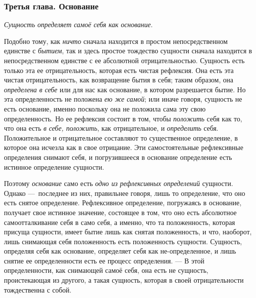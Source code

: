 \subsubsection{Третья глава. Основание}
{\em Сущность определяет самоё себя как основание}.

Подобно тому, как {\em ничто} сначала находится в
простом непосредственном единстве с {\em бытием}, так и
здесь простое тождество сущности сначала находится в непосредственном
единстве с ее абсолютной отрицательностью. Сущность есть только эта ее
отрицательность, которая есть чистая рефлексия. Она есть эта чистая
отрицательность, как возвращение бытия в себя; таким образом, она
{\em определена в себе} или для нас как основание, в
котором разрешается бытие. Но эта определенность не положена
{\em ею же самой}; или иначе говоря, сущность не есть
основание, именно поскольку она не положила сама эту свою определенность.
Но ее рефлексия состоит в том, чтобы {\em положить}
себя как то, что она есть {\em в себе, положить}, как
отрицательное, и {\em определить} себя. Положительное и
отрицательное составляют то существенное определение, в которое она исчезла
как в свое отрицание. Эти самостоятельные рефлексивные определения снимают
себя, и погрузившееся в основание определение есть истинное определение
сущности.

Поэтому {\em основание} само есть
{\em одно из рефлексивных определений} сущности. Однако
—~последнее из них, правильнее говоря, лишь то определение, что оно есть
снятое определение. Рефлексивное определение, погружаясь в основание,
получает свое истинное значение, состоящее в том, что оно есть абсолютное
самоотталкивание себя в само себя, а именно, что та положенность, которая
присуща сущности, имеет бытие лишь как снятая положенность, и что,
наоборот, лишь снимающая себя положенность есть положенность сущности.
Сущность, определяя себя как основание, определяет себя как
не-определенное, и лишь снятие ее определенности есть ее процесс
определения. — В этой определенности, как снимающей самоё себя, она есть не
сущность, проистекающая из другого, а такая сущность, которая в своей
отрицательности тождественна с собой.

